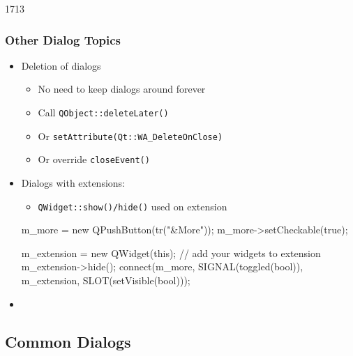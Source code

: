 \begin{slide}[fragile]{1713}
  \frametitle{Other Dialog Topics}
 \begin{itemize}
  \item Deletion of dialogs
    \begin{itemize}
    \item No need to keep dialogs around forever
    \item Call \texttt{QObject::deleteLater()}
    \item Or \texttt{setAttribute(Qt::WA\_DeleteOnClose)}
    \item Or override \texttt{closeEvent()}
   \end{itemize}
 \end{itemize}
 \begin{itemize}
 \item Dialogs with extensions:
    \begin{itemize}
    \item \texttt{QWidget::show()/hide()} used on extension
    \end{itemize}
   \begin{cpp}
m_more = new QPushButton(tr("&More"));
m_more->setCheckable(true);
    \end{cpp}
   \begin{cpp}
m_extension = new QWidget(this);
// add your widgets to extension
m_extension->hide();
connect(m_more, SIGNAL(toggled(bool)), 
  m_extension, SLOT(setVisible(bool)));
      \end{cpp}
    \item {}
  \end{itemize}
\end{slide}


\subsection{Common Dialogs}

